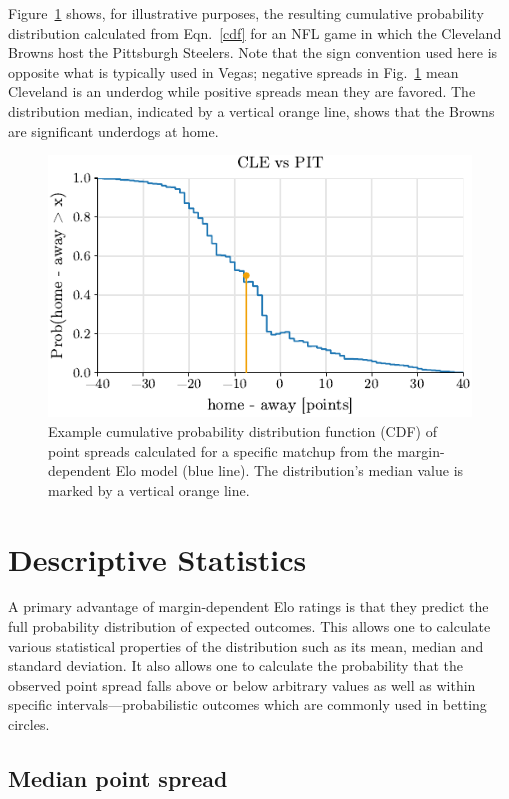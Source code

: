 \documentclass[aps,prc,reprint,amsmath,superscriptaddress,nofootinbib]{revtex4-1}
\begin{document}
Figure~\ref{fig:example} shows, for illustrative purposes, the resulting cumulative probability distribution calculated from Eqn.~\eqref{cdf} for an NFL game in which the Cleveland Browns host the Pittsburgh Steelers. 
Note that the sign convention used here is opposite what is typically used in Vegas; negative spreads in Fig.~\ref{fig:example} mean Cleveland is an underdog while positive spreads mean they are favored.
The distribution median, indicated by a vertical orange line, shows that the Browns are significant underdogs at home.

\begin{figure}
  \includegraphics{example_distribution}
  \caption{\label{fig:example} Example cumulative probability distribution function (CDF) of point spreads calculated for a specific matchup from the margin-dependent Elo model (blue line). The distribution's median value is marked by a vertical orange line.}
\end{figure}

\section{Descriptive Statistics}

A primary advantage of margin-dependent Elo ratings is that they predict the full probability distribution of expected outcomes.
This allows one to calculate various statistical properties of the distribution such as its mean, median and standard deviation.
It also allows one to calculate the probability that the observed point spread falls above or below arbitrary values as well as within specific intervals---probabilistic outcomes which are commonly used in betting circles.

\subsection{Median point spread}
\end{document}

